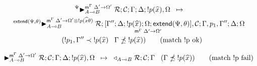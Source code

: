 \begin{multline}
\transx{\matstateb{A \lolli B}{\rulestk}{\lstack{C}}{\Gamma}{\Delta}{\bang
   p(\widehat{x}),
   \Omega}{\Delta' \rightarrow \Omega'}{\Psi}}
{\matstateb{A \lolli B}{\rulestk}{\pframe{\Gamma''}{\Delta}{\bang
   p(\widehat{x})}{\Omega; \m{extend}(\Psi, \theta)}{\Delta'}{\Omega'}, \lstack{C}}{\Gamma, p_1,
      \Gamma''}{\Delta}{\Omega}{\Delta' \rightarrow \Omega' \otimes \bang
         p(\widehat{x}\theta)}{\m{extend}(\Psi, \theta)}} \\
      \;\;\; (\bang p_1, \Gamma'' \prec \bang p(\widehat{x}) \;\;\; \Gamma
      \npreceq \bang p(\widehat{x})) \tag{match \bang p
      ok}
\end{multline}

\begin{align}
\trans{\matstate{A \lolli B}{\rulestk}{\lstack{C}}{\Gamma}{\Delta}{\bang
   p(\widehat{x}),
   \Omega}{\Delta' \rightarrow \Omega'}}
{\contstate{A \lolli B}{\rulestk}{\lstack{C}}{\Gamma}} \;\;\; (\Gamma \npreceq
\bang p(\widehat{x})) \tag{match \bang p fail}
\end{align}
